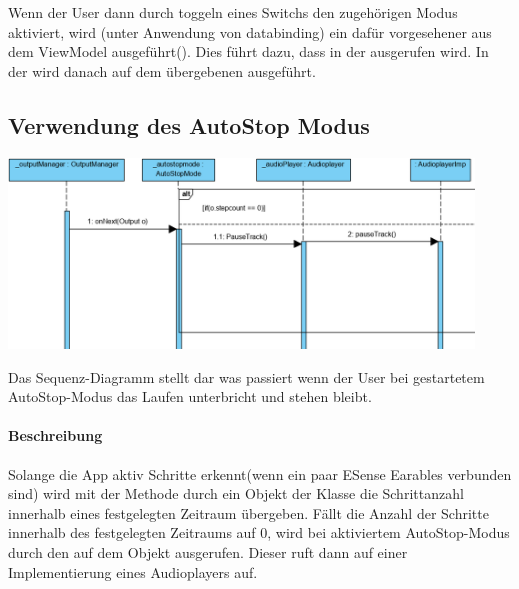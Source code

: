 \documentclass[../entwurf.tex]{subfiles}
\begin{document}
Wenn der User dann durch toggeln eines Switchs den zugehörigen Modus aktiviert, wird (unter Anwendung von \Gls{databinding}) ein dafür vorgesehener  aus dem ViewModel ausgeführt(). Dies führt dazu, dass  in der  ausgerufen wird. In der  wird danach  auf dem übergebenen  ausgeführt.

\subsection{Verwendung des AutoStop Modus}
\begin{center}
	\includegraphics[page=1,width=350pt,keepaspectratio]{../graphics/sequenz_diagramme/AutoStopDia.png}
\end{center}
Das Sequenz-Diagramm stellt dar was passiert wenn der User bei gestartetem AutoStop-Modus das Laufen unterbricht und stehen bleibt.
\paragraph{Beschreibung}
Solange die App aktiv Schritte erkennt(wenn ein paar ESense Earables verbunden sind) wird mit der Methode  durch ein Objekt der Klasse  die Schrittanzahl innerhalb eines festgelegten Zeitraum übergeben. Fällt die Anzahl der Schritte innerhalb des festgelegten Zeitraums auf 0, wird bei aktiviertem AutoStop-Modus durch den    auf 
dem Objekt  ausgerufen. Dieser ruft dann auf einer Implementierung eines Audioplayers  auf.
\end{document}
